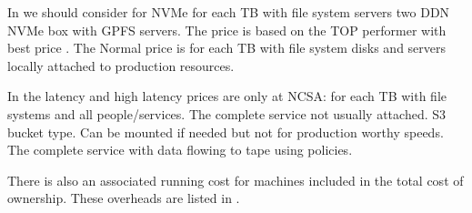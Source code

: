 

In  we should consider for NVMe for each TB with file system servers two DDN NVMe box with GPFS servers.
The price is based on the TOP performer with best price .
The Normal price is for each TB with file system disks and servers locally attached to production resources.

In the latency and high latency prices are only at NCSA: for each TB with file systems and all people/services.
The complete service not usually attached.   S3 bucket type.
Can be mounted if needed but not for production worthy speeds.
The complete service with data flowing to tape using policies.



There is also an associated running cost for machines included in the total cost of ownership.
These overheads are listed in .





